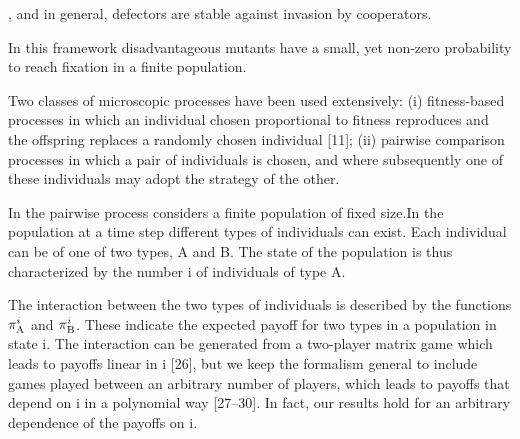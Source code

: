 \documentclass[11pt]{article}
\theoremstyle{plainCl1}
\theoremstyle{plainCl2}
\begin{document}


 , and 
in general, defectors are stable against invasion by cooperators.



In this framework disadvantageous mutants have a small, yet non-zero probability
to reach fixation in a finite population. 

Two classes of microscopic processes have been used extensively: (i)
fitness-based processes in which an individual chosen proportional to fitness
reproduces and the offspring replaces a randomly chosen individual [11]; (ii)
pairwise comparison processes in which a pair of individuals is chosen, and
where subsequently one of these individuals may adopt the strategy of the other.

In the pairwise process considers a finite population of fixed size.In the
population at a time step different types of individuals can exist. 
Each individual can be of one of two types, A and B. The state of the population
is thus characterized by the number i of individuals of type A. 

The interaction between the two types of individuals is described by the
functions $\pi _{{\rm A}}^{i}$ and $\pi _{{\rm B}}^{i}$. These indicate the
expected payoff for two types in a population in state i. The interaction can be
generated from a two-player matrix game which leads to payoffs linear in i [26],
but we keep the formalism general to include games played between an arbitrary
number of players, which leads to payoffs that depend on i in a polynomial way
[27–30]. In fact, our results hold for an arbitrary dependence of the payoffs on
i.
\end{document}

